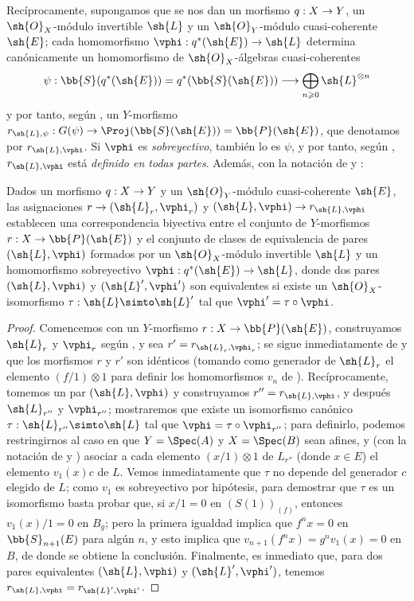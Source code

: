 \documentclass[oneside,10pt]{amsart}
\makeatletter
\renewcommand{\geq}{\geqslant}
\newcommand{\ega@arrow}[2]{\mathchoice{#1}{#2}{#2}{#2}}
\renewcommand{\to}{\ega@arrow{\longrightarrow}{\rightarrow}}
\newcommand{\oldpage}[2][]{\marginnote{\normalfont\footnotesize\textbf{#1}~|~#2}\ignorespaces}
\let\EGAOriginalLabel\label
\renewcommand{\label}[1]{\phantomsection\EGAOriginalLabel{#1}}
\makeatother
\begin{document}
\begin{env}[4.2.2]
\label{II.4.2.2}
Recíprocamente, supongamos que se nos dan un morfismo $q:X\to Y$, un $\sh{O}_X$-módulo invertible $\sh{L}$ y un $\sh{O}_Y$-módulo cuasi-coherente $\sh{E}$;
cada homomorfismo $\vphi:q^*(\sh{E})\to\sh{L}$ determina canónicamente un homomorfismo de $\sh{O}_X$-álgebras cuasi-coherentes
\[
  \psi: \bb{S}(q^*(\sh{E})) = q^*(\bb{S}(\sh{E})) \to \bigoplus_{n\geq0}\sh{L}^{\otimes n}
\]
y por tanto, según , un $Y$-morfismo $r_{\sh{L},\psi}:G(\psi)\to\Proj(\bb{S}(\sh{E}))=\bb{P}(\sh{E})$, que denotamos por $r_{\sh{L},\vphi}$.
Si $\vphi$ es \emph{sobreyectivo}, también lo es $\psi$, y por tanto, según , $r_{\sh{L},\vphi}$ está \emph{definido en todas partes}.
Además, con la notación de  y :
\end{env}

\begin{proposition}[4.2.3]
\label{II.4.2.3}
Dados un morfismo $q:X\to Y$ y un $\sh{O}_Y$-módulo cuasi-coherente $\sh{E}$, las asignaciones $r\to(\sh{L}_r,\vphi_r)$ y $(\sh{L},\vphi)\to r_{\sh{L},\vphi}$ establecen una correspondencia biyectiva entre el conjunto de $Y$-morfismos $r:X\to\bb{P}(\sh{E})$ y el conjunto de clases de equivalencia de pares $(\sh{L},\vphi)$ formados por un $\sh{O}_X$-módulo invertible $\sh{L}$ y un homomorfismo sobreyectivo $\vphi:q^*(\sh{E})\to\sh{L}$, donde dos pares $(\sh{L},\vphi)$ y $(\sh{L}',\vphi')$ son equivalentes si existe un $\sh{O}_X$-isomorfismo $\tau:\sh{L}\simto\sh{L}'$ tal que $\vphi'=\tau\circ\vphi$.
\end{proposition}

\begin{proof}
Comencemos con un $Y$-morfismo $r:X\to\bb{P}(\sh{E})$, construyamos $\sh{L}_r$ y $\vphi_r$ según , y sea $r'=r_{\sh{L}_r,\vphi_r}$;
se sigue inmediatamente de  y  que los morfismos $r$ y $r'$ son idénticos (tomando como generador de $\sh{L}_r$ el elemento $(f/1)\otimes1$ para definir los homomorfismos $v_n$ de ).
Recíprocamente, tomemos un par $(\sh{L},\vphi)$ y construyamos
\oldpage[II]{74}
$r''=r_{\sh{L},\vphi}$, y después $\sh{L}_{r''}$ y $\vphi_{r''}$;
mostraremos que existe un isomorfismo canónico $\tau:\sh{L}_{r''}\simto\sh{L}$ tal que $\vphi=\tau\circ\vphi_{r''}$;
para definirlo, podemos restringirnos al caso en que $Y=\Spec(A)$ y $X=\Spec(B)$ sean afines, y (con la notación de  y ) asociar a cada elemento $(x/1)\otimes1$ de $L_{r''}$ (donde $x\in E$) el elemento $v_1(x)c$ de $L$.
Vemos inmediatamente que $\tau$ no depende del generador $c$ elegido de $L$;
como $v_1$ es sobreyectivo por hipótesis, para demostrar que $\tau$ es un isomorfismo basta probar que, si $x/1=0$ en $(S(1))_{(f)}$, entonces $v_1(x)/1=0$ en $B_g$;
pero la primera igualdad implica que $f^nx=0$ en $\bb{S}_{n+1}(E)$ para algún $n$, y esto implica que $v_{n+1}(f^nx)=g^nv_1(x)=0$ en $B$, de donde se obtiene la conclusión.
Finalmente, es inmediato que, para dos pares equivalentes $(\sh{L},\vphi)$ y $(\sh{L}',\vphi')$, tenemos $r_{\sh{L},\vphi}=r_{\sh{L}',\vphi'}$.
\end{proof}
\end{document}
